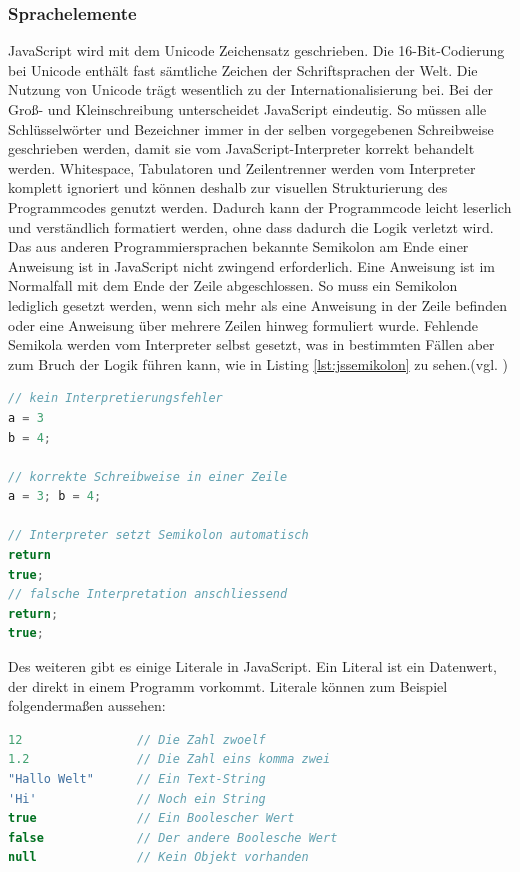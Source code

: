 \subsubsection{Sprachelemente} JavaScript wird mit dem Unicode Zeichensatz geschrieben. Die 16-Bit-Codierung bei Unicode enthält fast sämtliche Zeichen der Schriftsprachen der Welt. Die Nutzung von Unicode trägt wesentlich zu der Internationalisierung bei. Bei der Groß- und Kleinschreibung unterscheidet JavaScript eindeutig. So müssen alle Schlüsselwörter und Bezeichner immer in der selben vorgegebenen Schreibweise geschrieben werden, damit sie vom JavaScript-Interpreter korrekt behandelt werden. Whitespace, Tabulatoren und Zeilentrenner werden vom Interpreter komplett ignoriert und können deshalb zur visuellen Strukturierung des Programmcodes genutzt werden. Dadurch kann der Programmcode leicht leserlich und verständlich formatiert werden, ohne dass dadurch die Logik verletzt wird. Das aus anderen Programmiersprachen bekannte Semikolon am Ende einer Anweisung ist in JavaScript nicht zwingend erforderlich. Eine Anweisung ist im Normalfall mit dem Ende der Zeile abgeschlossen. So muss ein Semikolon lediglich gesetzt werden, wenn sich mehr als eine Anweisung in der Zeile befinden oder eine Anweisung über mehrere Zeilen hinweg formuliert wurde. Fehlende Semikola werden vom Interpreter selbst gesetzt, was in bestimmten Fällen aber zum Bruch der Logik führen kann, wie in Listing \ref{lst:jssemikolon} zu sehen.(vgl. \cite[S.15ff]{FlanJava2007})

\vspace{1em}
\begin{lstlisting}[language=JavaScript, caption=JavaScript Logikbruch Semikolon, label=lst:jssemikolon]
// kein Interpretierungsfehler
a = 3
b = 4;

// korrekte Schreibweise in einer Zeile
a = 3; b = 4;

// Interpreter setzt Semikolon automatisch
return
true;
// falsche Interpretation anschliessend
return;
true;
\end{lstlisting}

Des weiteren gibt es einige Literale in JavaScript. \glqq Ein Literal ist ein Datenwert, der direkt in einem Programm vorkommt. Literale können zum Beispiel folgendermaßen aussehen:\grqq{}\cite[S.18]{FlanJava2007}

\vspace{1em}
\begin{lstlisting}[language=JavaScript, caption=JavaScript Literale, label=lst:jsliterale]
12                // Die Zahl zwoelf
1.2               // Die Zahl eins komma zwei
"Hallo Welt"      // Ein Text-String
'Hi'              // Noch ein String
true              // Ein Boolescher Wert
false             // Der andere Boolesche Wert
null              // Kein Objekt vorhanden
\end{lstlisting}
	
